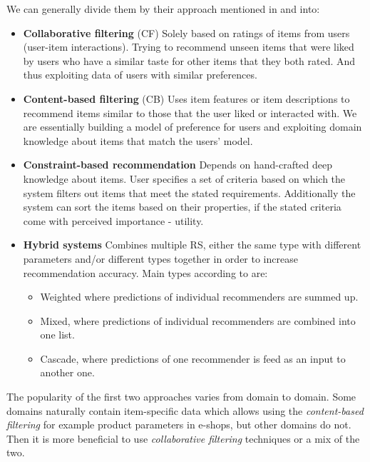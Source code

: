 We can generally divide them by their approach mentioned in \cite{RS_handbook-ricci2011} and \cite{constraint_based_recommenders} into:
\begin{itemize}
    \item \textbf{Collaborative filtering} (CF)\newline
        Solely based on ratings of items from users (user-item interactions). Trying to recommend unseen items that were liked by users who have a similar taste for other items that they both rated. And thus exploiting data of users with similar preferences.
    \item  \textbf{Content-based filtering} (CB)\newline
        Uses item features or item descriptions to recommend items similar to those that the user liked or interacted with. We are essentially building a model of preference for users and exploiting domain knowledge about items that match the users' model.
    \item \textbf{Constraint-based recommendation}\newline
        Depends on hand-crafted deep knowledge about items. User specifies a set of criteria based on which the system filters out items that meet the stated requirements. Additionally the system can sort the items based on their properties, if the stated criteria come with perceived importance - utility.
    \item \textbf{Hybrid systems}\newline    
        Combines multiple RS, either the same type with different parameters and/or different types together in order to increase recommendation accuracy. Main types according to \cite{grouprecommendersystems_felfernig2018group} are:
        \begin{itemize}
            \item Weighted where predictions of individual recommenders are summed up.
            \item Mixed, where predictions of individual recommenders are combined into one list.
            \item Cascade, where predictions of one recommender is feed as an input to another one.
        \end{itemize}
\end{itemize}

The popularity of the first two approaches varies from domain to domain. Some domains naturally contain item-specific data which allows using the \textit{content-based filtering} for example product parameters in e-shops, but other domains do not. Then it is more beneficial to use \textit{collaborative filtering} techniques or a mix of the two.

